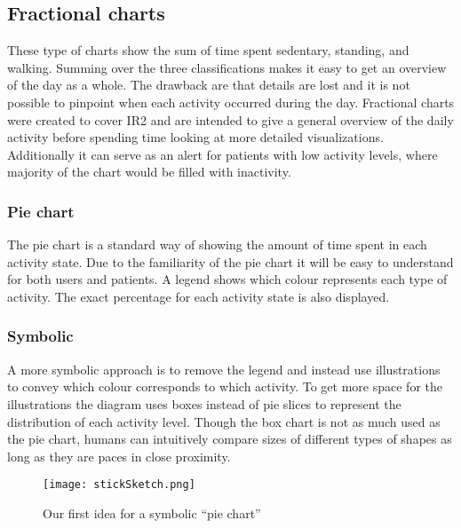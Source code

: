 \subsection{Fractional charts}
These type of charts show the sum of time spent sedentary, standing, and walking. Summing over the three classifications makes it easy to get an overview of the day as a whole. The drawback are that details are lost and it is not possible to pinpoint when each activity occurred during the day. Fractional charts were created to cover IR2 and are intended to give a general overview of the daily activity before spending time looking at more detailed visualizations. Additionally it can serve as an alert for patients with low activity levels, where majority of the chart would be filled with inactivity.

\subsubsection{Pie chart}
The pie chart is a standard way of showing the amount of time spent in each activity state. Due to the familiarity of the pie chart it will be easy to understand for both users and patients. A legend shows which colour represents each type of activity. The exact percentage for each activity state is also displayed.

\subsubsection{Symbolic}
A more symbolic approach is to remove the legend and instead use illustrations to convey which colour corresponds to which activity. To get more space for the illustrations the diagram uses boxes instead of pie slices to represent the distribution of each activity level. Though the box chart is not as much used as the pie chart, humans can intuitively compare sizes of different types of shapes as long as they are paces in close proximity. 

\begin{figure}[h!]
	\centering
		\texttt{[image: stickSketch.png]}
		\caption{\footnotesize Our first idea for a symbolic ``pie chart''}
		\label{fig:symbolicPie}
\end{figure}


